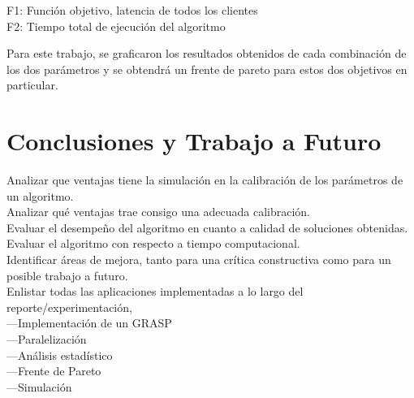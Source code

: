 \documentclass{article}
\begin{document}
F1: Función objetivo, latencia de todos los clientes\\
F2: Tiempo total de ejecución del algoritmo 

Para este trabajo, se graficaron los resultados obtenidos de cada combinación de los dos parámetros y se obtendrá un frente de pareto para estos dos objetivos en particular.

\section{Conclusiones y Trabajo a Futuro}

Analizar que ventajas tiene la simulación en la calibración de los parámetros de un algoritmo.\\

Analizar qué ventajas trae consigo una adecuada calibración.\\

Evaluar el desempeño del algoritmo en cuanto a calidad de soluciones obtenidas.\\

Evaluar el algoritmo con respecto a tiempo computacional.\\

Identificar áreas de mejora, tanto para una crítica constructiva como para un posible trabajo a futuro.\\


Enlistar todas las aplicaciones implementadas a lo largo del reporte/experimentación,\\
---Implementación de un GRASP\\
---Paralelización\\
---Análisis estadístico\\
---Frente de Pareto\\
---Simulación\\
\end{document}
